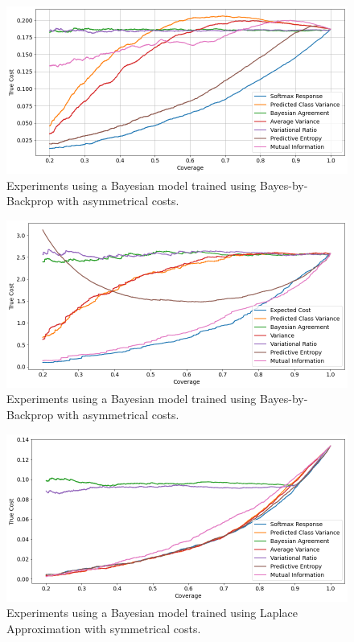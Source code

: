\begin{figure}[h]
	\includegraphics[width=\textwidth]{images/multi-class/bbb-sym.png}
	\caption{Experiments using a Bayesian model trained using Bayes-by-Backprop with asymmetrical costs.}
\end{figure}

\begin{figure}[h]
	\includegraphics[width=\textwidth]{images/multi-class/bbb-asym.png}
	\caption{Experiments using a Bayesian model trained using Bayes-by-Backprop with asymmetrical costs.}
\end{figure}


\begin{figure}[h]
	\includegraphics[width=\textwidth]{images/multi-class/laplace-sym.png}
	\caption{Experiments using a Bayesian model trained using Laplace Approximation with symmetrical costs.}
\end{figure}


